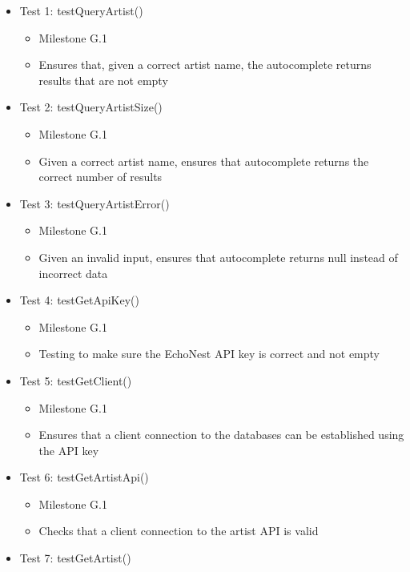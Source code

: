 \documentclass[]{article}
\begin{document}
\begin{itemize}
\itemsep1pt\parskip0pt
\item
  Test 1: testQueryArtist()

  \begin{itemize}
  \itemsep1pt\parskip0pt
  \item
    Milestone G.1
  \item
    Ensures that, given a correct artist name, the autocomplete returns
    results that are not empty
  \end{itemize}
\item
  Test 2: testQueryArtistSize()

  \begin{itemize}
  \itemsep1pt\parskip0pt
  \item
    Milestone G.1
  \item
    Given a correct artist name, ensures that autocomplete returns the
    correct number of results
  \end{itemize}
\item
  Test 3: testQueryArtistError()

  \begin{itemize}
  \itemsep1pt\parskip0pt
  \item
    Milestone G.1
  \item
    Given an invalid input, ensures that autocomplete returns null
    instead of incorrect data
  \end{itemize}
\item
  Test 4: testGetApiKey()

  \begin{itemize}
  \itemsep1pt\parskip0pt
  \item
    Milestone G.1
  \item
    Testing to make sure the EchoNest API key is correct and not empty
  \end{itemize}
\item
  Test 5: testGetClient()

  \begin{itemize}
  \itemsep1pt\parskip0pt
  \item
    Milestone G.1
  \item
    Ensures that a client connection to the databases can be established
    using the API key
  \end{itemize}
\item
  Test 6: testGetArtistApi()

  \begin{itemize}
  \itemsep1pt\parskip0pt
  \item
    Milestone G.1
  \item
    Checks that a client connection to the artist API is valid
  \end{itemize}
\item
  Test 7: testGetArtist()


\end{itemize}
\end{document}
